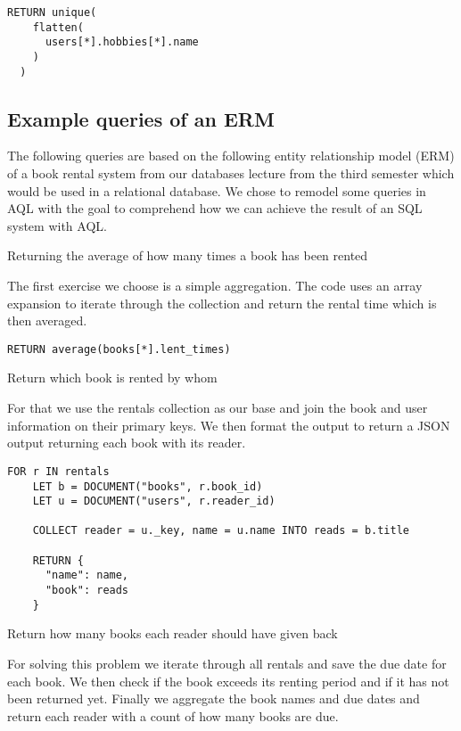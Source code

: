 \begin{lstlisting}[language=ArangoQL,label={lst:graph},caption={Array Expansion}]
  RETURN unique(
    flatten(
      users[*].hobbies[*].name
    )
  )
\end{lstlisting}

\subsection{Example queries of an ERM}

The following queries are based on the following entity relationship model (ERM) of a book rental system from our databases lecture from the third semester which would be used in a relational database. We chose to remodel some queries in AQL with the goal to comprehend how we can achieve the result of an SQL system with AQL.

Returning the average of how many times a book has been rented

The first exercise we choose is a simple aggregation. The code uses an array expansion to iterate through the collection and return the rental time which is then averaged.

\begin{lstlisting}[language=ArangoQL,label={lst:graph},caption={Returning the average of how many times a book has been rented}]
  RETURN average(books[*].lent_times)
\end{lstlisting}

Return which book is rented by whom

For that we use the rentals collection as our base and join the book and user information on their primary keys. We then format the output to return a JSON output returning each book with its reader.

\begin{lstlisting}[language=ArangoQL,label={lst:graph},caption={Return which book is rented by whom}]
  FOR r IN rentals
    LET b = DOCUMENT("books", r.book_id)
    LET u = DOCUMENT("users", r.reader_id)
    
    COLLECT reader = u._key, name = u.name INTO reads = b.title

    RETURN {
      "name": name,
      "book": reads
    }
\end{lstlisting}

Return how many books each reader should have given back

For solving this problem we iterate through all rentals and save the due date for each book. We then check if the book exceeds its renting period and if it has not been returned yet. Finally we aggregate the book names and due dates and return each reader with a count of how many books are due.


